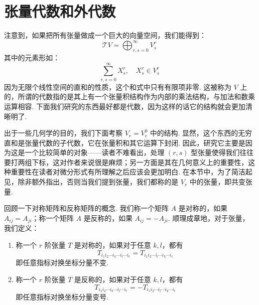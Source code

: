 

\section{张量代数和外代数}

注意到，如果把所有张量做成一个巨大的向量空间，我们能得到：
\[
\mathcal{T} V = \bigoplus_{r, s = 0}^{\infty} V^r_s
\]
其中的元素形如：
\[
\sum_{r, s = 0}^\infty X^r_s, \quad X^r_s \in V^r_s
\]
因为无限个线性空间的直和的性质，这个和式中只有有限项非零. 这被称为 $V$ 上的，所谓的代数指的是其上有一个张量积结构作为内部的乘法结构，与加法和数乘运算相容. 下面我们研究的东西最好都是代数，因为这样的话它的结构就会更加清晰明了.

出于一些几何学的目的，我们下面考察 $V_r = V_r^0$ 中的结构. 显然，这个东西的无穷直和是张量代数的子代数，它在张量积和其它运算下封闭. 因此，研究它主要是因为这是一个比较简单的对象——读者不难看出，处理 $(r, s)$ 型张量使得我们往往要打两组下标，这对作者来说很是麻烦；另一方面是其在几何意义上的重要性，这种重要性在读者对微分形式有所理解之后应该会更加明白. 在本节中，为了简洁起见，除非额外指出，否则当我们提到张量，我们都称的是 $V_r$ 中的张量，即共变张量.

回顾一下对称矩阵和反称矩阵的概念. 我们称一个矩阵 $A$ 是对称的，如果 $A_{ij} = A_{ji}$；称一个矩阵 $A$ 是反称的，如果 $A_{ij} = -A_{ji}$. 顺理成章地，对于张量，我们定义：

\begin{definition}{}{}
    \begin{enumerate}
        \item 称一个 $r$ 阶张量 $T$ 是对称的，如果对于任意 $k, l$，都有 \[
        T_{i_1 i_2 \cdots i_k \cdots i_l \cdots i_r} = T_{i_1 i_2 \cdots i_l \cdots i_k \cdots i_r}
        \]
        即任意指标对换坐标分量不变.
        \item 称一个 $r$ 阶张量 $T$ 是反称的，如果对于任意 $k, l$，都有 \[
        T_{i_1 i_2 \cdots i_k \cdots i_l \cdots i_r} = -T_{i_1 i_2 \cdots i_l \cdots i_k \cdots i_r}
        \]
        即任意指标对换坐标分量变号.
    \end{enumerate}
\end{definition}

